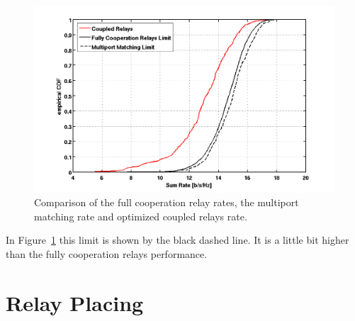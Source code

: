 \begin{figure}[h]
\centering
  \includegraphics[width=0.9\linewidth]{images/Limitcomparison.png}
\caption{Comparison of the full cooperation relay rates, the multiport matching rate and optimized coupled relays rate.}
\label{fig:limcomparison}
\end{figure}

In Figure~\ref{fig:limcomparison} this limit is shown by the black dashed line.
It is a little bit higher than the fully cooperation relays performance.

\section{Relay Placing}
\label{sec:relay_placing}

